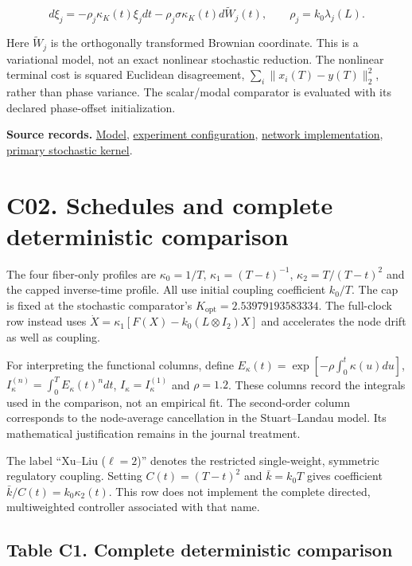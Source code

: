 \documentclass[11pt,a4paper]{article}
\begin{document}
\[
d\xi_j=-\rho_j\kappa_K(t)\xi_jdt-\rho_j\sigma\kappa_K(t)d\widetilde W_j(t),
\qquad \rho_j=k_0\lambda_j(L).
\]

Here \(\widetilde W_j\) is the orthogonally transformed Brownian
coordinate. This is a variational model, not an exact nonlinear
stochastic reduction. The nonlinear terminal cost is squared Euclidean
disagreement, \(\sum_i\|x_i(T)-y(T)\|_2^2\), rather than phase variance.
The scalar/modal comparator is evaluated with its declared phase-offset
initialization.

\textbf{Source records.} \href{MODEL.md}{Model},
\href{../config/experiments.json}{experiment configuration},
\href{../code/network_experiments.py}{network implementation},
\href{../code/stochastic_network.py}{primary stochastic kernel}.

\section{C02. Schedules and complete deterministic
comparison}\label{c02}

The four fiber-only profiles are \(\kappa_0=1/T\),
\(\kappa_1=(T-t)^{-1}\), \(\kappa_2=T/(T-t)^2\) and the capped
inverse-time profile. All use initial coupling coefficient \(k_0/T\).
The cap is fixed at the stochastic comparator's
\(K_{\mathrm{opt}}=2.53979193583334\). The full-clock row instead uses
\(\dot X=\kappa_1[F(X)-k_0(L\otimes I_2)X]\) and accelerates the node
drift as well as coupling.

For interpreting the functional columns, define
\(E_\kappa(t)=\exp[-\rho\int_0^t\kappa(u)du]\),
\(I_\kappa^{(n)}=\int_0^T E_\kappa(t)^n dt\),
\(I_\kappa=I_\kappa^{(1)}\) and \(\rho=1.2\). These columns record the
integrals used in the comparison, not an empirical fit. The second-order
column corresponds to the node-average cancellation in the
Stuart--Landau model. Its mathematical justification remains in the
journal treatment.

The label ``Xu--Liu (\(\ell=2\))'' denotes the restricted single-weight,
symmetric regulatory coupling. Setting \(C(t)=(T-t)^2\) and
\(\bar k=k_0T\) gives coefficient \(\bar k/C(t)=k_0\kappa_2(t)\). This
row does not implement the complete directed, multiweighted controller
associated with that name.

\subsection{Table C1. Complete deterministic comparison}\label{table-c1}
\end{document}
